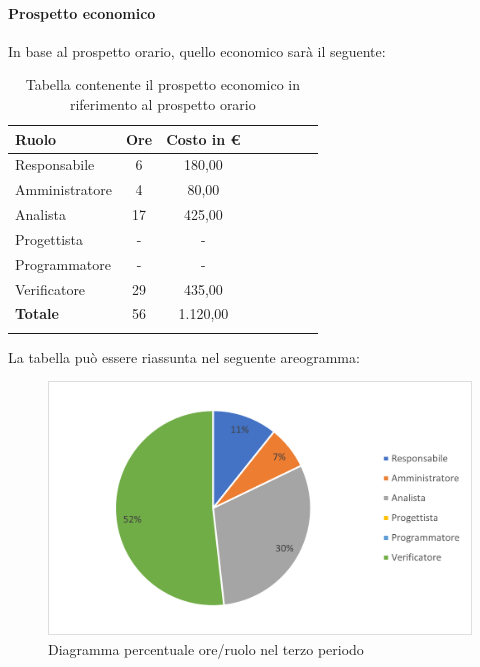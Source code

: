 \paragraph{Prospetto economico}
In base al prospetto orario, quello economico sarà il seguente:

\begin{longtable}{|l|c|c|c|c|c|c|c|}
	\hline
	\rowcolor{lighter-grayer}
	\textbf{Ruolo}  & \textbf{Ore} & \textbf{Costo in €} \\
	\hline
	\endfirsthead

	\hline
	Responsabile    & 6            & 180,00              \\
	\hline
	\hline
	Amministratore  & 4            & 80,00               \\
	\hline
	\hline
	Analista        & 17           & 425,00              \\
	\hline
	\hline
	Progettista     & -            & -                   \\
	\hline
	\hline
	Programmatore   & -            & -                   \\
	\hline
	\hline
	Verificatore    & 29           & 435,00              \\
	\hline
	\textbf{Totale} & 56           & 1.120,00            \\
	\hline
	\rowcolor{white}
	\caption{Tabella contenente il prospetto economico in riferimento al prospetto orario}
\end{longtable}
\pagebreak

La tabella può essere riassunta nel seguente areogramma:
\begin{figure}[H]
	\centering
	\includegraphics[width=0.8\linewidth]{res/images/preventivo/dettaglio_analisi/3-2.png}
	\caption{Diagramma percentuale ore/ruolo nel terzo periodo}
	\label{fig:diagramma costi ruolo terzo periodo analisi}
\end{figure}

